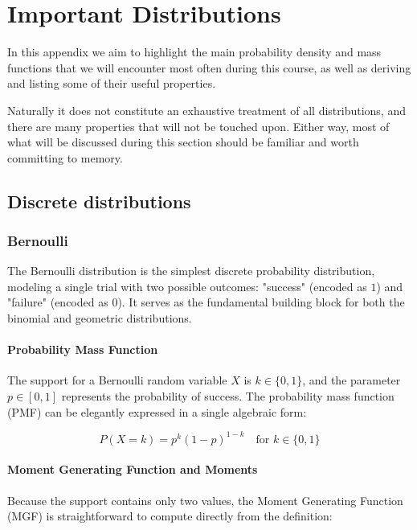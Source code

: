 \chapter{Important Distributions}
In this appendix we aim to highlight the main probability density and mass functions that we will encounter most often during this course, as well as deriving and listing some of their useful properties. 

Naturally it does not constitute an exhaustive treatment of all distributions, and there are many properties that will not be touched upon. Either way, most of what will be discussed during this section should be familiar and worth committing to memory.

\clearpage
\section{Discrete distributions}
\label{Appendix:discrete}

\subsection{Bernoulli}

The Bernoulli distribution is the simplest discrete probability distribution, modeling a single trial with two possible outcomes: "success" (encoded as $1$) and "failure" (encoded as $0$). It serves as the fundamental building block for both the binomial and geometric distributions.

\subsubsection{Probability Mass Function}
The support for a Bernoulli random variable $X$ is $k \in \{0, 1\}$, and the parameter $p \in [0, 1]$ represents the probability of success. The probability mass function (PMF) can be elegantly expressed in a single algebraic form:

\begin{equation}
	P(X = k) = p^k (1-p)^{1-k} \quad \text{for } k \in \{0, 1\}
	\label{pmf:bern}
\end{equation}

\subsubsection{Moment Generating Function and Moments}
Because the support contains only two values, the Moment Generating Function (MGF) is straightforward to compute directly from the definition:

